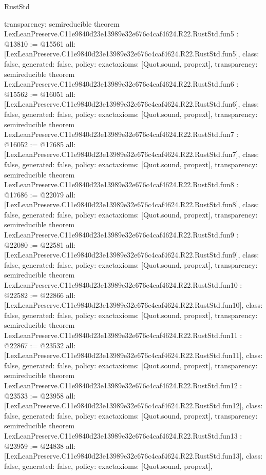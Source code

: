 \begin{lexlean}{RustStd}
\begin{coremodule}
{  transparency: semireducible
}
theorem LexLeanPreserve.C11e9840d23e13989e32e676c4caf4624.R22.RustStd.fun5 : @13810 := @15561 {
  all: [LexLeanPreserve.C11e9840d23e13989e32e676c4caf4624.R22.RustStd.fun5],
  class: false,
  generated: false,
  policy: exact{axioms: [Quot.sound, propext]},
  transparency: semireducible
}
theorem LexLeanPreserve.C11e9840d23e13989e32e676c4caf4624.R22.RustStd.fun6 : @15562 := @16051 {
  all: [LexLeanPreserve.C11e9840d23e13989e32e676c4caf4624.R22.RustStd.fun6],
  class: false,
  generated: false,
  policy: exact{axioms: [Quot.sound, propext]},
  transparency: semireducible
}
theorem LexLeanPreserve.C11e9840d23e13989e32e676c4caf4624.R22.RustStd.fun7 : @16052 := @17685 {
  all: [LexLeanPreserve.C11e9840d23e13989e32e676c4caf4624.R22.RustStd.fun7],
  class: false,
  generated: false,
  policy: exact{axioms: [Quot.sound, propext]},
  transparency: semireducible
}
theorem LexLeanPreserve.C11e9840d23e13989e32e676c4caf4624.R22.RustStd.fun8 : @17686 := @22079 {
  all: [LexLeanPreserve.C11e9840d23e13989e32e676c4caf4624.R22.RustStd.fun8],
  class: false,
  generated: false,
  policy: exact{axioms: [Quot.sound, propext]},
  transparency: semireducible
}
theorem LexLeanPreserve.C11e9840d23e13989e32e676c4caf4624.R22.RustStd.fun9 : @22080 := @22581 {
  all: [LexLeanPreserve.C11e9840d23e13989e32e676c4caf4624.R22.RustStd.fun9],
  class: false,
  generated: false,
  policy: exact{axioms: [Quot.sound, propext]},
  transparency: semireducible
}
theorem LexLeanPreserve.C11e9840d23e13989e32e676c4caf4624.R22.RustStd.fun10 : @22582 := @22866 {
  all: [LexLeanPreserve.C11e9840d23e13989e32e676c4caf4624.R22.RustStd.fun10],
  class: false,
  generated: false,
  policy: exact{axioms: [Quot.sound, propext]},
  transparency: semireducible
}
theorem LexLeanPreserve.C11e9840d23e13989e32e676c4caf4624.R22.RustStd.fun11 : @22867 := @23532 {
  all: [LexLeanPreserve.C11e9840d23e13989e32e676c4caf4624.R22.RustStd.fun11],
  class: false,
  generated: false,
  policy: exact{axioms: [Quot.sound, propext]},
  transparency: semireducible
}
theorem LexLeanPreserve.C11e9840d23e13989e32e676c4caf4624.R22.RustStd.fun12 : @23533 := @23958 {
  all: [LexLeanPreserve.C11e9840d23e13989e32e676c4caf4624.R22.RustStd.fun12],
  class: false,
  generated: false,
  policy: exact{axioms: [Quot.sound, propext]},
  transparency: semireducible
}
theorem LexLeanPreserve.C11e9840d23e13989e32e676c4caf4624.R22.RustStd.fun13 : @23959 := @24838 {
  all: [LexLeanPreserve.C11e9840d23e13989e32e676c4caf4624.R22.RustStd.fun13],
  class: false,
  generated: false,
  policy: exact{axioms: [Quot.sound, propext]},
}
\end{coremodule}
\end{lexlean}

